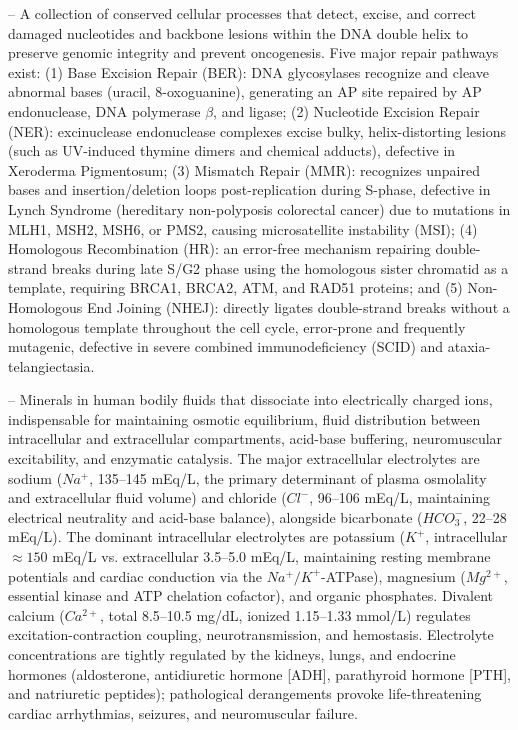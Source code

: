 -- A collection of conserved cellular processes that detect, excise, and correct damaged nucleotides and backbone lesions within the DNA double helix to preserve genomic integrity and prevent oncogenesis. Five major repair pathways exist: (1) Base Excision Repair (BER): DNA glycosylases recognize and cleave abnormal bases (uracil, 8-oxoguanine), generating an AP site repaired by AP endonuclease, DNA polymerase $\beta$, and ligase; (2) Nucleotide Excision Repair (NER): excinuclease endonuclease complexes excise bulky, helix-distorting lesions (such as UV-induced thymine dimers and chemical adducts), defective in Xeroderma Pigmentosum; (3) Mismatch Repair (MMR): recognizes unpaired bases and insertion/deletion loops post-replication during S-phase, defective in Lynch Syndrome (hereditary non-polyposis colorectal cancer) due to mutations in MLH1, MSH2, MSH6, or PMS2, causing microsatellite instability (MSI); (4) Homologous Recombination (HR): an error-free mechanism repairing double-strand breaks during late S/G2 phase using the homologous sister chromatid as a template, requiring BRCA1, BRCA2, ATM, and RAD51 proteins; and (5) Non-Homologous End Joining (NHEJ): directly ligates double-strand breaks without a homologous template throughout the cell cycle, error-prone and frequently mutagenic, defective in severe combined immunodeficiency (SCID) and ataxia-telangiectasia.

-- Minerals in human bodily fluids that dissociate into electrically charged ions, indispensable for maintaining osmotic equilibrium, fluid distribution between intracellular and extracellular compartments, acid-base buffering, neuromuscular excitability, and enzymatic catalysis. The major extracellular electrolytes are sodium ($Na^+$, 135--145 mEq/L, the primary determinant of plasma osmolality and extracellular fluid volume) and chloride ($Cl^-$, 96--106 mEq/L, maintaining electrical neutrality and acid-base balance), alongside bicarbonate ($HCO_3^-$, 22--28 mEq/L). The dominant intracellular electrolytes are potassium ($K^+$, intracellular $\approx 150$ mEq/L vs. extracellular 3.5--5.0 mEq/L, maintaining resting membrane potentials and cardiac conduction via the $Na^+/K^+$-ATPase), magnesium ($Mg^{2+}$, essential kinase and ATP chelation cofactor), and organic phosphates. Divalent calcium ($Ca^{2+}$, total 8.5--10.5 mg/dL, ionized 1.15--1.33 mmol/L) regulates excitation-contraction coupling, neurotransmission, and hemostasis. Electrolyte concentrations are tightly regulated by the kidneys, lungs, and endocrine hormones (aldosterone, antidiuretic hormone [ADH], parathyroid hormone [PTH], and natriuretic peptides); pathological derangements provoke life-threatening cardiac arrhythmias, seizures, and neuromuscular failure.


